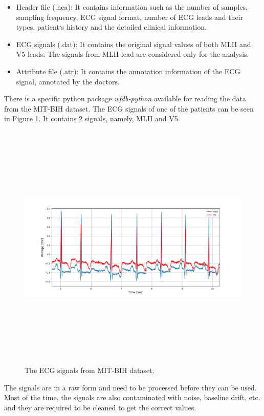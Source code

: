 \begin{itemize}
	\item Header file (.hea): It contains information such as the number of samples, sampling frequency, ECG signal format, number of ECG leads and their types, patient`s history and the detailed clinical information.
	
	\item ECG signals (.dat): It contains the original signal values of both MLII and V5 leads. The signals from MLII lead are considered only for the analysis.
	
	\item Attribute file (.atr): It contains the annotation information of the ECG signal, annotated by the doctors.
\end{itemize}

There is a specific python package \textit{wfdb-python} available for reading the data from the MIT-BIH dataset. The ECG signals of one of the patients can be seen in Figure \ref{fig:all_signals}. It contains 2 signals, namely, MLII and V5.


\begin{figure}[h]
	\centering
	\includegraphics[width=15cm,height=12cm,keepaspectratio=true]{images/all_signals}
	\caption{
		The ECG signals from MIT-BIH dataset.
	}
	\label{fig:all_signals}
\end{figure}


The signals are in a raw form and need to be processed before they can be used. Most of the time, the signals are also contaminated with noise, baseline drift, etc. and they are required to be cleaned to get the correct values. 


